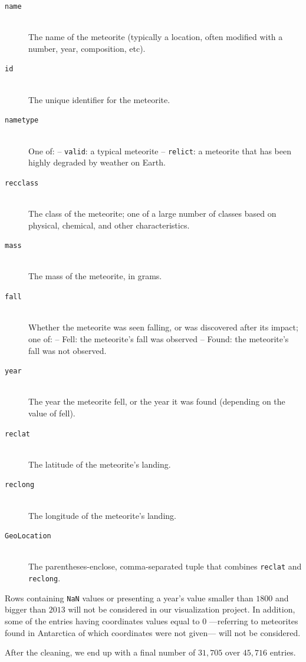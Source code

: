 \documentclass[10pt,conference,compsocconf]{IEEEtran}
\begin{document}
\begin{description}
\item[\texttt{name}] \ \\
  The name of the meteorite (typically a location, often modified with a number, year, composition, etc).
\item[\texttt{id}] \ \\
  The unique identifier for the meteorite.
\item[\texttt{nametype}] \ \\
  One of: -- \texttt{valid}: a typical meteorite -- \texttt{relict}: a meteorite that has been highly degraded by weather on Earth.
\item[\texttt{recclass}] \ \\
  The class of the meteorite; one of a large number of classes based on physical, chemical, and other characteristics.
\item[\texttt{mass}] \ \\
  The mass of the meteorite, in grams.
\item[\texttt{fall}] \ \\
   Whether the meteorite was seen falling, or was discovered after its impact; one of: -- Fell: the meteorite's fall was observed -- Found: the meteorite's fall was not observed.
\item[\texttt{year}] \ \\
  The year the meteorite fell, or the year it was found (depending on the value of fell).
\item[\texttt{reclat}] \ \\
  The latitude of the meteorite's landing.
\item[\texttt{reclong}] \ \\
  The longitude of the meteorite's landing.
\item[\texttt{GeoLocation}] \ \\
  The parentheses-enclose, comma-separated tuple that combines \texttt{reclat} and \texttt{reclong}.
\end{description}

Rows containing \texttt{NaN} values or presenting a year’s value smaller than $1800$ and bigger than $2013$ will not be considered in our visualization project. In addition, some of the entries having coordinates values equal to $0$ ---referring to meteorites found in Antarctica of which coordinates were not given--- will not be considered. 


After the cleaning, we end up with a final number of $31,705$ over $45,716$ entries.
\end{document}
